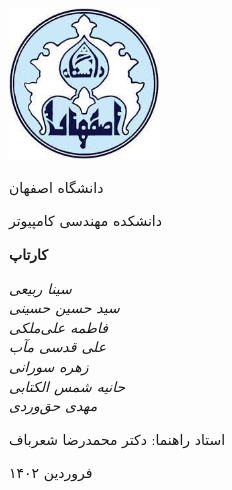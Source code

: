 \documentclass[12pt, oneside]{book}
\begin{document}
    \begin{titlepage}
    	\centering
    	\includegraphics[width=4cm, height=4cm]{logo}\par
        \vspace{2mm}
    	دانشگاه اصفهان \par
        دانشکده مهندسی کامپیوتر \par

    	\vspace{1cm}
    	{\huge \textbf{کارتاپ}\par}
    	\vspace{3cm}
    	{\small\itshape
        سینا ربیعی \\
    	سید حسین حسینی \\
    	فاطمه علی‌ملکی \\
    	علی قدسی مآب \\
    	زهره سورانی \\
    	حانیه شمس الکتابی \\
    	مهدی حق‌وردی\par}

    	\vfill
        استاد راهنما:‌ دکتر محمدرضا شعرباف
    	\vfill

    	{\large فروردین ۱۴۰۲\par}
    \end{titlepage}
\end{document}
